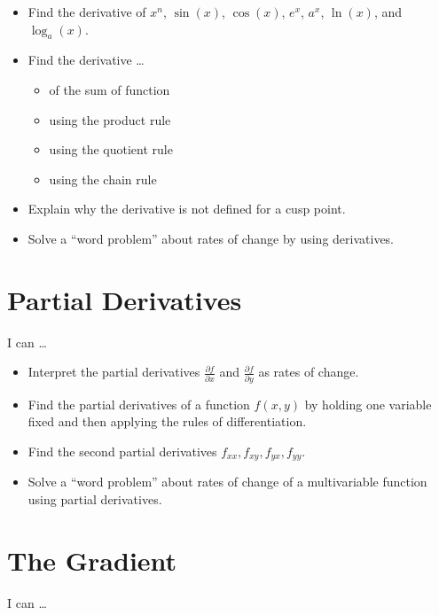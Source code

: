 \documentclass[
]{book}
\providecommand{\tightlist}{%
  \setlength{\itemsep}{0pt}\setlength{\parskip}{0pt}}
\begin{document}
\begin{itemize}
\tightlist
\item
  Find the derivative of \(x^n\), \(\sin(x)\), \(\cos(x)\), \(e^x\), \(a^x\), \(\ln(x)\), and \(\log_a(x)\).
\item
  Find the derivative \ldots{}

  \begin{itemize}
  \tightlist
  \item
    of the sum of function
  \item
    using the product rule
  \item
    using the quotient rule
  \item
    using the chain rule
  \end{itemize}
\item
  Explain why the derivative is not defined for a cusp point.
\item
  Solve a ``word problem'' about rates of change by using derivatives.
\end{itemize}

\hypertarget{partial-derivatives-2}{%
\section{Partial Derivatives}\label{partial-derivatives-2}}

I can \ldots{}

\begin{itemize}
\tightlist
\item
  Interpret the partial derivatives \(\frac{\partial f}{\partial x}\) and \(\frac{\partial f}{\partial y}\) as rates of change.
\item
  Find the partial derivatives of a function \(f(x,y)\) by holding one variable fixed and then applying the rules of differentiation.
\item
  Find the second partial derivatives \(f_{xx}, f_{xy}, f_{yx}, f_{yy}\).
\item
  Solve a ``word problem'' about rates of change of a multivariable function using partial derivatives.
\end{itemize}

\hypertarget{the-gradient-1}{%
\section{The Gradient}\label{the-gradient-1}}

I can \ldots{}
\end{document}
